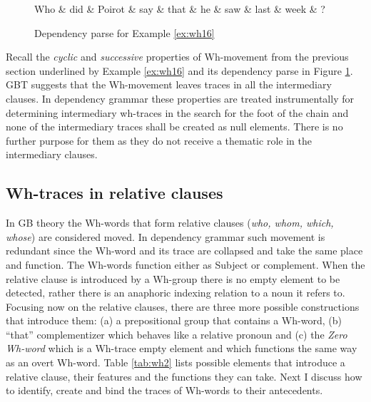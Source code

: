 \begin{figure}[H]
	\centering
	\begin{dependency}
		\begin{deptext}[]
			Who \& did \& Poirot \& say \& that \& he \& saw \& last \& week \& ?\\
		\end{deptext}
	\end{dependency}
	\caption{Dependency parse for Example \ref{ex:wh16}}
	\label{fig:e17}
\end{figure}

Recall the \textit{cyclic} and \textit{successive} properties of Wh-movement from the previous section underlined by Example \ref{ex:wh16} and its dependency parse in Figure \ref{fig:e17}. GBT suggests that the Wh-movement leaves traces in all the intermediary clauses. In dependency grammar these properties are treated instrumentally for determining intermediary wh-traces in the search for the foot of the chain and none of the intermediary traces shall be created as null elements. There is no further purpose for them as they do not receive a thematic role in the intermediary clauses. 

\subsection{Wh-traces in relative clauses}
\label{sec:wh-traces-relative}
In GB theory the Wh-words that form relative clauses (\textit{who, whom, which, whose}) are considered moved. In dependency grammar such movement is redundant since the Wh-word and its trace are collapsed and take the same place and function. The Wh-words function either as Subject or complement. When the relative clause is introduced by a Wh-group there is no empty element to be detected, rather there is an anaphoric indexing relation to a noun it refers to. Focusing now on the relative clauses, there are three more possible constructions that introduce them: (a) a prepositional group that contains a Wh-word, (b) ``that'' complementizer which behaves like a relative pronoun and (c) the \textit{Zero Wh-word} which is a Wh-trace empty element and which functions the same way as an overt Wh-word. Table \ref{tab:wh2} lists possible elements that introduce a relative clause, their features and the functions they can take. 
Next I discuss how to identify, create and bind the traces of Wh-words to their antecedents. 

